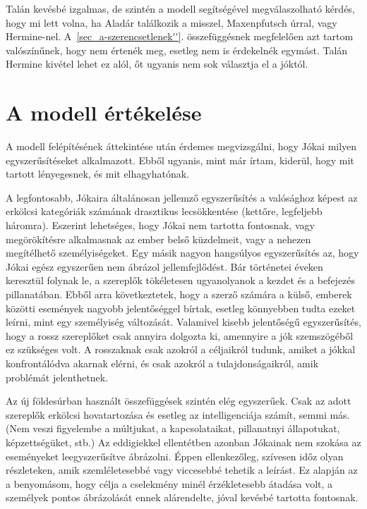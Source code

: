 \documentclass{thesis-ekf}
\begin{document}
    Talán kevésbé izgalmas, de szintén a modell segítségével megválaszolható kérdés, hogy mi lett volna,
        ha Aladár találkozik a misszel, Maxenpfutsch úrral, vagy Hermine-nel.
    A~\ref{sec_a-szerencsetlenek''}. összefüggésnek megfelelően azt tartom valószínűnek, hogy nem értenék meg,
        esetleg nem is érdekelnék egymást.
    Talán Hermine kivétel lehet ez alól, őt ugyanis nem sok választja el a jóktól.

    \section{A modell értékelése}

    A modell felépítésének áttekintése után érdemes megvizsgálni, hogy Jókai milyen egyszerűsítéseket alkalmazott.
    Ebből ugyanis, mint már írtam, kiderül, hogy mit tartott lényegesnek, és mit elhagyhatónak.

    A legfontosabb, Jókaira általánosan jellemző egyszerűsítés a valósághoz képest az erkölcsi kategóriák számának
        drasztikus lecsökkentése (kettőre, legfeljebb háromra).
    Eszerint lehetséges, hogy Jókai nem tartotta fontosnak, vagy megörökítésre alkalmasnak az ember belső küzdelmeit,
        vagy a nehezen megítélhető személyiségeket.
    Egy másik nagyon hangsúlyos egyszerűsítés az, hogy Jókai egész egyszerűen nem ábrázol jellemfejlődést.
    Bár történetei éveken keresztül folynak le, a szereplők tökéletesen ugyanolyanok a kezdet és a befejezés pillanatában.
    Ebből arra következtetek, hogy a szerző számára a külső, emberek közötti események nagyobb jelentőséggel bírtak,
        esetleg könnyebben tudta ezeket leírni, mint egy személyiség változását.
    Valamivel kisebb jelentőségű egyszerűsítés, hogy a rossz szereplőket csak annyira dolgozta ki,
        amennyire a jók szemszögéből ez szükséges volt.
    A rosszaknak csak azokról a céljaikról tudunk, amiket a jókkal konfrontálódva akarnak elérni, és csak azokról
        a tulajdonságaikról, amik problémát jelenthetnek.

    Az új földesúrban használt összefüggések szintén elég egyszerűek.
    Csak az adott szereplők erkölcsi hovatartozása és esetleg az intelligenciája számít, semmi más.
    (Nem veszi figyelembe a múltjukat, a kapcsolataikat, pillanatnyi állapotukat, képzettségüket, stb.)
    Az eddigiekkel ellentétben azonban Jókainak nem szokása az eseményeket leegyszerűsítve ábrázolni.
    Éppen ellenkezőleg, szívesen időz olyan részleteken, amik szemléletesebbé vagy viccesebbé tehetik a leírást.
    Ez alapján az a benyomásom, hogy célja a cselekmény minél érzékletesebb átadása volt,
        a személyek pontos ábrázolását ennek alárendelte, jóval kevésbé tartotta fontosnak.
\end{document}
